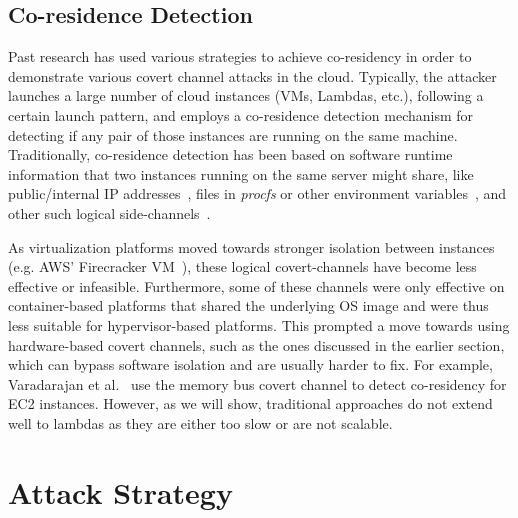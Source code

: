 \subsection{Co-residence Detection}
\label{sec:background:pastwork}

 Past research has used various strategies to achieve co-residency in order 
to demonstrate various covert channel attacks in the cloud. Typically, the
attacker launches a large number of cloud instances (VMs, Lambdas, etc.),
following a certain launch pattern, and employs a co-residence detection
mechanism for detecting if any pair of those instances are running on the same
machine. Traditionally, co-residence detection has been based on software
runtime information that two instances running on the same server might share,
like public/internal IP addresses~\cite{ristenpartccs2009}, files in
\textit{procfs} or other environment
variables~\cite{wangusenix2018,wuusenix2012}, and other such logical
side-channels~\cite{varad191016,vmplacement}.

As virtualization platforms moved towards stronger isolation between instances (e.g.
AWS' Firecracker VM~\cite{firecracker}), these logical covert-channels have
become less effective or infeasible. Furthermore, some of these channels were
only effective on container-based platforms that shared the underlying OS image
and were thus less suitable for hypervisor-based platforms.  This prompted a
move towards using hardware-based covert channels, such as the ones discussed in
the earlier section, which can bypass software isolation and are usually harder
to fix. For example, Varadarajan et al.~\cite{varadarajan2015} use the memory
bus covert channel to detect co-residency for EC2 instances.  However, as we
will show, traditional approaches do not extend well to lambdas as they are either too
slow or are not scalable. 


\section{Attack Strategy}
\label{sec:attackstrategy}
